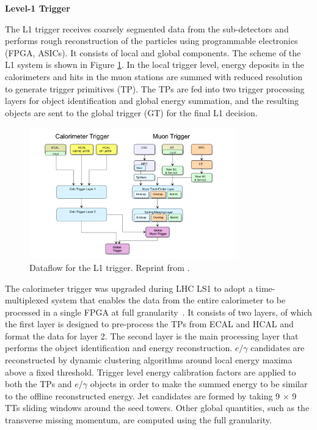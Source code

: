 \documentclass[thesis.tex]{subfiles}
\begin{document}
\noindent \textbf{Level-1 Trigger}

The L1 trigger receives coarsely segmented data from the sub-detectors and performs rough reconstruction of the particles using programmable electronics (FPGA, ASICs).
It consists of local and global components. 
The scheme of the L1 system is shown in Figure \ref{fig:L1}.
In the local trigger level, energy deposits in the calorimeters and hits in the muon stations are summed with reduced resolution to generate trigger primitives (TP). 
The TPs are fed into two trigger processing layers for object identification and global energy summation, and the resulting objects are sent to the global trigger (GT) for the final L1 decision.

\begin{figure}[hbt]
	\centering
	\includegraphics[width=0.8\textwidth]{plot/L1flow.png}
	\caption{Dataflow for the L1 trigger. Reprint from \cite{Tapper:1556311}.}
	\label{fig:L1}
\end{figure}


The calorimeter trigger was upgraded during LHC LS1 to adopt a time-multiplexed system that enables the data from the entire calorimeter to be processed in a single FPGA at full granularity~\cite{Zabi}.
It consists of two layers, of which the first layer is designed to pre-process the TPs from ECAL and HCAL and format the data for layer 2.
The second layer is the main processing layer that performs the object identification and energy reconstruction. 
$e/\gamma$ candidates are reconstructed by dynamic clustering algorithms around local energy maxima above a fixed threshold. 
Trigger level energy calibration factors are applied to both the TPs and $e/\gamma$ objects in order to make the summed energy to be similar to the offline reconstructed energy. 
Jet candidates are formed by taking 9 $\times$ 9 TTs sliding windows around the seed towers. 
Other global quantities, such as the transverse missing momentum, are computed using the full granularity.
\end{document}
